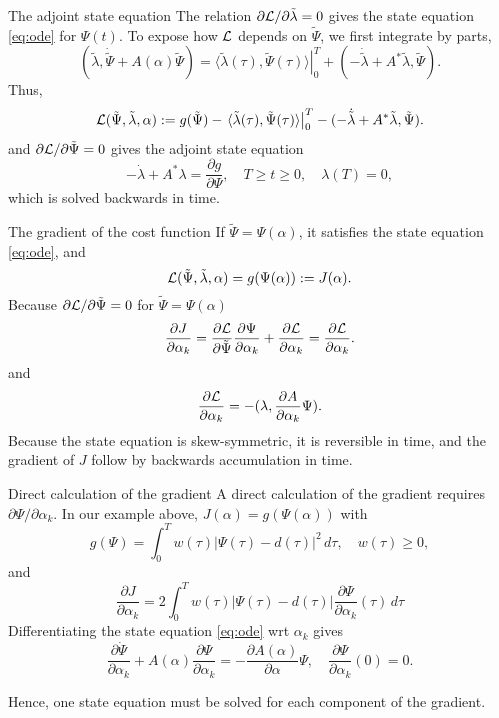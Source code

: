 \documentclass{beamer}
\begin{document}
\begin{frame}{The adjoint state equation}
The relation $\partial{\cal L}/\partial \tilde{\lambda} = 0$ gives the state equation
\eqref{eq:ode} for $\Psi(t)$. To expose how $\cal L$ depends on $\tilde{\Psi}$, we first integrate by parts,
\[
(\tilde{\lambda}, \dot{\tilde{\Psi}} + A(\alpha)\tilde{\Psi}) = \left.\langle
\tilde{\lambda}(\tau),\tilde{\Psi}(\tau)\rangle \right |_0^T +
(-\dot{\tilde{\lambda}}+A^*\tilde{\lambda}, \tilde{\Psi}). 
\]
Thus,
\[
  {\cal L}(\tilde{\Psi},\tilde{\lambda},\alpha) := g(\tilde{\Psi})
  - \left.\langle \tilde{\lambda}(\tau),\tilde{\Psi}(\tau)\rangle \right |_0^T
  - (-\dot{\tilde{\lambda}} +A^*\tilde{\lambda}, \tilde{\Psi}).
\]
and $\partial{\cal L}/\partial \tilde{\Psi} = 0$ gives the adjoint state equation
\begin{equation}\label{eq:adjoint}
 -\dot{\lambda} + A^*\lambda = \frac{\partial g}{\partial \Psi} ,\quad T\geq t\geq 0, \quad \lambda(T)=0,
\end{equation}
which is solved backwards in time.
\end{frame}

\begin{frame}{The gradient of the cost function}
  If $\tilde{\Psi} = \Psi(\alpha)$, it satisfies the state equation \eqref{eq:ode}, and
  \[
    {\cal L}(\tilde{\Psi},\tilde{\lambda},\alpha) =
    g(\Psi(\alpha)) := J(\alpha).
  \]
Because $\partial {\cal L}/\partial \tilde{\Psi}=0$ for $\tilde{\Psi}=\Psi(\alpha)$
\[
\frac{\partial J}{\partial \alpha_k} = \frac{\partial {\cal L}}{\partial \tilde{\Psi}}
\frac{\partial{\Psi}}{\partial \alpha_k} + \frac{\partial {\cal L}}{\partial \alpha_k} = \frac{\partial
  {\cal L}}{\partial \alpha_k}. 
\]
and
\[
\frac{\partial{\cal L}}{\partial \alpha_k} = - (\lambda,\frac{\partial A}{\partial \alpha_k}\Psi). 
\]
Because the state equation is skew-symmetric, it is reversible in time, and the gradient of $J$
follow by backwards accumulation in time.
\end{frame}

\begin{frame}{Direct calculation of the gradient}
A direct calculation of the gradient requires ${\partial \Psi}/{\partial \alpha_k}$.
In our example above, $J(\alpha) = g(\Psi(\alpha))$ with
\[
g(\Psi) = \int_0^T w(\tau) |\Psi(\tau) - d(\tau)|^2\, d\tau, \quad w(\tau)\geq 0,
\]
and
\[
\frac{\partial J}{\partial \alpha_k} = 2 \int_0^T w(\tau) |\Psi(\tau) - d(\tau)| \frac{\partial
  \Psi}{\partial \alpha_k}(\tau)\, d\tau
\]
Differentiating the state equation \eqref{eq:ode} wrt $\alpha_k$ gives
\[
  \frac{\partial \dot{\Psi}}{\partial \alpha_k} + A(\alpha)\frac{\partial \Psi}{\partial \alpha_k} =
  - \frac{\partial A(\alpha)}{\partial \alpha} \Psi,\quad \frac{\partial \Psi}{\partial \alpha_k}(0)=0.
\]
\end{frame}
Hence, one state equation must be solved for each component of the gradient.
\end{document}
